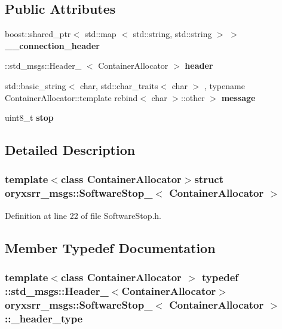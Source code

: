 \subsection*{\-Public \-Attributes}
\begin{DoxyCompactItemize}
\item 
boost\-::shared\-\_\-ptr$<$ std\-::map\*
$<$ std\-::string, std\-::string $>$ $>$ {\bf \-\_\-\-\_\-connection\-\_\-header}
\item 
\-::std\-\_\-msgs\-::\-Header\-\_\-\*
$<$ \-Container\-Allocator $>$ {\bf header}
\item 
std\-::basic\-\_\-string$<$ char, \*
std\-::char\-\_\-traits$<$ char $>$\*
, typename \*
\-Container\-Allocator\-::template \*
rebind$<$ char $>$\-::other $>$ {\bf message}
\item 
uint8\-\_\-t {\bf stop}
\end{DoxyCompactItemize}


\subsection{\-Detailed \-Description}
\subsubsection*{template$<$class Container\-Allocator$>$struct oryxsrr\-\_\-msgs\-::\-Software\-Stop\-\_\-$<$ Container\-Allocator $>$}



\-Definition at line 22 of file \-Software\-Stop.\-h.



\subsection{\-Member \-Typedef \-Documentation}
\subsubsection[{\-\_\-header\-\_\-type}]{\setlength{\rightskip}{0pt plus 5cm}template$<$class Container\-Allocator $>$ typedef \-::std\-\_\-msgs\-::\-Header\-\_\-$<$\-Container\-Allocator$>$ {\bf oryxsrr\-\_\-msgs\-::\-Software\-Stop\-\_\-}$<$ \-Container\-Allocator $>$\-::{\bf \-\_\-header\-\_\-type}}\label{structoryxsrr__msgs_1_1SoftwareStop___ae03e507a4b170f8c677a9657482b895f}


